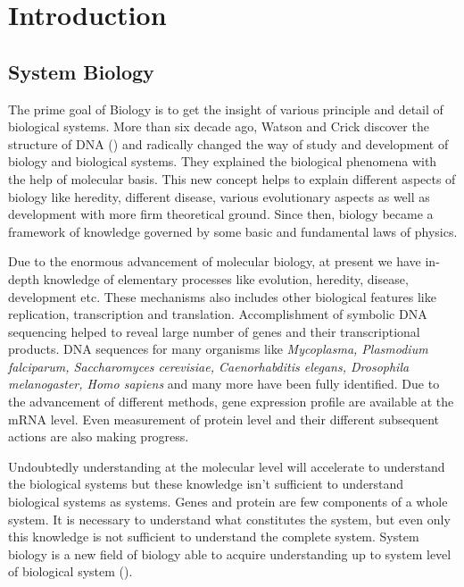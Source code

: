 
\chapter{Introduction} \label{ch:Introduction} %

\ifpdf
    \graphicspath{{Chapter1/Figs/Raster/}{Chapter1/Figs/PDF/}{Chapter1/Figs/}}
\else
    \graphicspath{{Chapter1/Figs/Vector/}{Chapter1/Figs/}}
\fi


\section{System Biology}
The prime goal of Biology is to get the insight of various principle and detail of biological systems. More than six decade ago, Watson and Crick discover the structure of DNA (\cite{Watson:1953}) and radically changed the way of study and development of biology and biological systems. They explained the biological phenomena with the help of molecular basis. This new concept helps to explain different aspects of biology like heredity, different disease, various evolutionary aspects as well as development with more firm theoretical ground. Since then, biology became a framework of knowledge governed by some basic and fundamental laws of physics.

Due to the enormous advancement of molecular biology, at present we have in-depth knowledge of elementary processes like evolution, heredity, disease, development etc. These mechanisms also includes other biological features like replication, transcription and translation. Accomplishment of symbolic DNA sequencing helped to reveal large number of genes and their transcriptional products. DNA sequences for many organisms like \textit{Mycoplasma, Plasmodium falciparum, Saccharomyces cerevisiae, \textit{Caenorhabditis elegans}, Drosophila melanogaster, Homo sapiens} and many more have been fully identified. Due to the advancement of different methods, gene expression profile are available at the mRNA level. Even measurement of protein level and their different subsequent actions are also making progress. 

Undoubtedly understanding at the molecular level will accelerate to understand the biological systems but these knowledge isn't sufficient to understand biological systems as systems. Genes and protein are few components of a whole system. It is necessary to understand what constitutes the system, but even only this knowledge is not sufficient to understand the complete system. System biology is a new field of biology able to acquire understanding up to system level of biological system (\cite{Kitano:2000}). 

